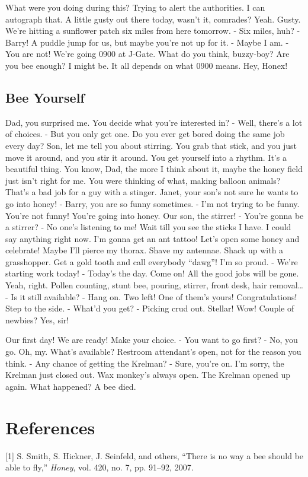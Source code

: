 \documentclass[
  letterpaper,
  twocolumn]{article}
\begin{document}
What were you doing during this? Trying to alert the authorities. I can
autograph that. A little gusty out there today, wasn't it, comrades?
Yeah. Gusty. We're hitting a sunflower patch six miles from here
tomorrow. - Six miles, huh? - Barry! A puddle jump for us, but maybe
you're not up for it. - Maybe I am. - You are not! We're going 0900 at
J-Gate. What do you think, buzzy-boy? Are you bee enough? I might be. It
all depends on what 0900 means. Hey, Honex!

\hypertarget{bee-yourself}{%
\subsection{Bee Yourself}\label{bee-yourself}}

Dad, you surprised me. You decide what you're interested in? - Well,
there's a lot of choices. - But you only get one. Do you ever get bored
doing the same job every day? Son, let me tell you about stirring. You
grab that stick, and you just move it around, and you stir it around.
You get yourself into a rhythm. It's a beautiful thing. You know, Dad,
the more I think about it, maybe the honey field just isn't right for
me. You were thinking of what, making balloon animals? That's a bad job
for a guy with a stinger. Janet, your son's not sure he wants to go into
honey! - Barry, you are so funny sometimes. - I'm not trying to be
funny. You're not funny! You're going into honey. Our son, the stirrer!
- You're gonna be a stirrer? - No one's listening to me! Wait till you
see the sticks I have. I could say anything right now. I'm gonna get an
ant tattoo! Let's open some honey and celebrate! Maybe I'll pierce my
thorax. Shave my antennae. Shack up with a grasshopper. Get a gold tooth
and call everybody ``dawg''! I'm so proud. - We're starting work today!
- Today's the day. Come on! All the good jobs will be gone. Yeah, right.
Pollen counting, stunt bee, pouring, stirrer, front desk, hair
removal\ldots{} - Is it still available? - Hang on. Two left! One of
them's yours! Congratulations! Step to the side. - What'd you get? -
Picking crud out. Stellar! Wow! Couple of newbies? Yes, sir!

Our first day! We are ready! Make your choice. - You want to go first? -
No, you go. Oh, my. What's available? Restroom attendant's open, not for
the reason you think. - Any chance of getting the Krelman? - Sure,
you're on. I'm sorry, the Krelman just closed out. Wax monkey's always
open. The Krelman opened up again. What happened? A bee died.

\hypertarget{references}{%
\section*{References}\label{references}}

\hypertarget{refs}{}
\leavevmode\hypertarget{ref-beeMovieId}{}%
{[}1{]} S. Smith, S. Hickner, J. Seinfeld, and others, ``There is no way
a bee should be able to fly,'' \emph{Honey}, vol. 420, no. 7, pp.
91--92, 2007.
\end{document}
